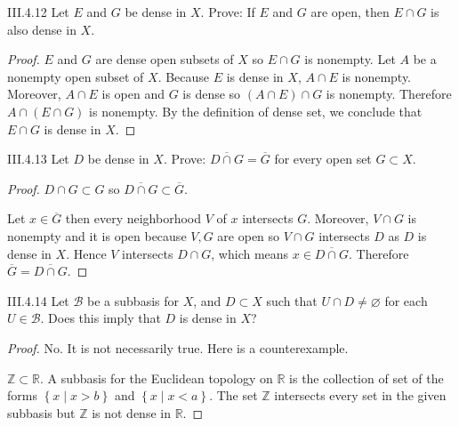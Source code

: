 \begin{problem}{III.4.12}
Let \(E\) and \(G\) be dense in \(X\). Prove: If \(E\) and \(G\) are open, then \(E \cap G\) is also dense in \(X\).
\end{problem}

\begin{proof}
	\( E \) and \( G \) are dense open subsets of \(X\) so \( E \cap G \) is nonempty. Let \( A \) be a nonempty open subset of \( X \). Because \( E \) is dense in \( X \), \( A \cap E \) is nonempty. Moreover, \( A \cap E \) is open and \( G \) is dense so \( (A \cap E) \cap G \) is nonempty. Therefore \( A \cap (E \cap G) \) is nonempty. By the definition of dense set, we conclude that \( E \cap G \) is dense in \( X \).
\end{proof}

\begin{problem}{III.4.13}\label{problem:III.4.13}
Let \(D\) be dense in \(X\). Prove: \( \overline{D \cap G} = \overline{G} \) for every open set \( G \subset X \).
\end{problem}

\begin{proof}
	\( D \cap G \subset G \) so \( \overline{D \cap G} \subset \overline{G} \).

	Let \( x \in \overline{G} \) then every neighborhood \(V\) of \(x\) intersects \( G \). Moreover, \( V \cap G \) is nonempty and it is open because \( V, G \) are open so \( V \cap G \) intersects \( D \) as \( D \) is dense in \( X \). Hence \( V \) intersects \( D \cap G \), which means \( x \in \overline{D \cap G} \). Therefore \( \overline{G} = \overline{D \cap G} \).
\end{proof}

\begin{problem}{III.4.14}
Let \( \mathscr{B} \) be a subbasis for \(X\), and \(D \subset X\) such that \( U \cap D \ne \varnothing \) for each \( U \in \mathscr{B} \). Does this imply that \(D\) is dense in \(X\)?
\end{problem}

\begin{proof}
	No. It is not necessarily true. Here is a counterexample.

	\( \mathbb{Z} \subset \mathbb{R} \). A subbasis for the Euclidean topology on \( \mathbb{R} \) is the collection of set of the forms \( \left\{ x \mid x > b \right\} \) and \( \left\{ x \mid x < a \right\} \). The set \( \mathbb{Z} \) intersects every set in the given subbasis but \( \mathbb{Z} \) is not dense in \( \mathbb{R} \).
\end{proof}


